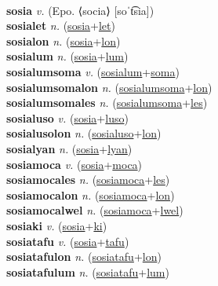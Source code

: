  \label{soh} \\
\textbf{sosia} \textit{v.} (Epo. ⟨socia⟩ [soˈt͡sia])
 \label{sosia} \\
\textbf{sosialet} \textit{n.} (\hyperref[sosia]{sosia}+\hyperref[let]{let})
 \label{sosialet} \\
\textbf{sosialon} \textit{n.} (\hyperref[sosia]{sosia}+\hyperref[lon]{lon})
 \label{sosialon} \\
\textbf{sosialum} \textit{n.} (\hyperref[sosia]{sosia}+\hyperref[lum]{lum})
 \label{sosialum} \\
\textbf{sosialumsoma} \textit{v.} (\hyperref[sosialum]{sosialum}+\hyperref[soma]{soma})
 \label{sosialumsoma} \\
\textbf{sosialumsomalon} \textit{n.} (\hyperref[sosialumsoma]{sosialumsoma}+\hyperref[lon]{lon})
 \label{sosialumsomalon} \\
\textbf{sosialumsomales} \textit{n.} (\hyperref[sosialumsoma]{sosialumsoma}+\hyperref[les]{les})
 \label{sosialumsomales} \\
\textbf{sosialuso} \textit{v.} (\hyperref[sosia]{sosia}+\hyperref[luso]{luso})
 \label{sosialuso} \\
\textbf{sosialusolon} \textit{n.} (\hyperref[sosialuso]{sosialuso}+\hyperref[lon]{lon})
 \label{sosialusolon} \\
\textbf{sosialyan} \textit{n.} (\hyperref[sosia]{sosia}+\hyperref[lyan]{lyan})
 \label{sosialyan} \\
\textbf{sosiamoca} \textit{v.} (\hyperref[sosia]{sosia}+\hyperref[moca]{moca})
 \label{sosiamoca} \\
\textbf{sosiamocales} \textit{n.} (\hyperref[sosiamoca]{sosiamoca}+\hyperref[les]{les})
 \label{sosiamocales} \\
\textbf{sosiamocalon} \textit{n.} (\hyperref[sosiamoca]{sosiamoca}+\hyperref[lon]{lon})
 \label{sosiamocalon} \\
\textbf{sosiamocalwel} \textit{n.} (\hyperref[sosiamoca]{sosiamoca}+\hyperref[lwel]{lwel})
 \label{sosiamocalwel} \\
\textbf{sosiaki} \textit{v.} (\hyperref[sosia]{sosia}+\hyperref[ki]{ki})
 \label{sosiaki} \\
\textbf{sosiatafu} \textit{v.} (\hyperref[sosia]{sosia}+\hyperref[tafu]{tafu})
 \label{sosiatafu} \\
\textbf{sosiatafulon} \textit{n.} (\hyperref[sosiatafu]{sosiatafu}+\hyperref[lon]{lon})
 \label{sosiatafulon} \\
\textbf{sosiatafulum} \textit{n.} (\hyperref[sosiatafu]{sosiatafu}+\hyperref[lum]{lum})
